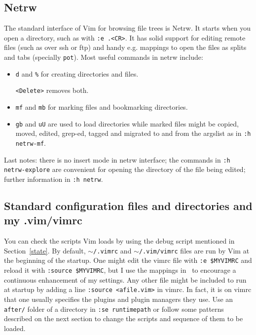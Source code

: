 \documentclass{article}
\newcommand{\ttt}[1] {
	\texttt{<#1>}}
\newcommand{\tttt}[1]{\texttt{#1}}
\begin{document}
\subsection{Netrw}\label{netrw}
The standard interface of Vim for browsing file trees is Netrw.
It starts when you open a directory, such as with \tttt{:e .<CR>}.
It has solid support for editing remote files (such as over ssh or
ftp) and handy e.g. mappings to open the files as splits and tabs (specially \tttt{pot}).
Most useful commands in netrw include:
\begin{itemize}
  \item \tttt{d} and \tttt{\%} for creating directories and files.
    \ttt{Delete} removes both.
  \item \tttt{mf} and \tttt{mb} for marking files and bookmarking directories.
  \item \tttt{gb} and \tttt{uU} are used to load directories
    while marked files might be copied, moved, edited, grep-ed, tagged and migrated
    to and from the argslist as in \tttt{:h netrw-mf}.
\end{itemize}
Last notes:
there is no insert mode in netrw interface;
the commands in \tttt{:h netrw-explore} are
convenient for opening the directory of the
file being edited;
further information in \tttt{:h netrw}.

\subsection{Standard configuration files and directories and my .vim/vimrc}
You can check the scripts Vim loads by using the debug script mentioned
in Section~\ref{state}.
By default, \tttt{$\sim$/.vimrc} and \tttt{$\sim$/.vim/vimrc} files are run by Vim at the beginning of the startup.
One might edit the vimrc file with \tttt{:e \$MYVIMRC}
and reload it with \tttt{:source \$MYVIMRC}, but
I use the mappings in~\cite{vimrc} to encourage a continuous enhancement of my settings.
Any other file might be included to run at startup by
adding a line \tttt{:source <afile.vim>} in vimrc.
In fact, it is on vimrc that one usually specifies the plugins
and plugin managers they use.
Use an \tttt{after/} folder of a directory in \tttt{:se runtimepath}
or follow some patterns described on the next section to change the
scripts and sequence of them to be loaded.
\end{document}
